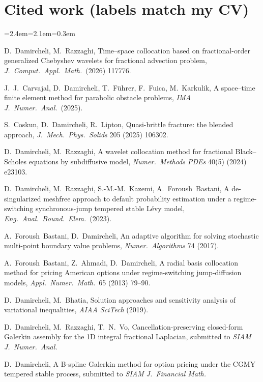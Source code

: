 \documentclass[11pt]{article}
\newcommand{\rc}[1]{\textcolor{accent}{[#1]}}
\begin{document}
\section*{Cited work {\normalfont\small(labels match my CV)}}
{\footnotesize
\setlength{\parskip}{0pt}
\begin{list}{}{\leftmargin=2.4em=2.1em=0.3em\itemsep=0pt\parsep=0pt}
\item[\rc{J1}] D.~Damircheli, M.~Razzaghi, Time--space collocation based on fractional-order generalized Chebyshev wavelets for fractional advection problem, \emph{J.\ Comput.\ Appl.\ Math.}\ (2026) 117776.
\item[\rc{J2}] J.~J.~Carvajal, D.~Damircheli, T.~F\"uhrer, F.~Fuica, M.~Karkulik, A space--time finite element method for parabolic obstacle problems, \emph{IMA J.\ Numer.\ Anal.}\ (2025).
\item[\rc{J3}] S.~Coskun, D.~Damircheli, R.~Lipton, Quasi-brittle fracture: the blended approach, \emph{J.\ Mech.\ Phys.\ Solids} 205 (2025) 106302.
\item[\rc{J4}] D.~Damircheli, M.~Razzaghi, A wavelet collocation method for fractional Black--Scholes equations by subdiffusive model, \emph{Numer.\ Methods PDEs} 40(5) (2024) e23103.
\item[\rc{J5}] D.~Damircheli, M.~Razzaghi, S.-M.-M.~Kazemi, A.~Foroush~Bastani, A de-singularized meshfree approach to default probability estimation under a regime-switching synchronous-jump tempered stable L\'evy model, \emph{Eng.\ Anal.\ Bound.\ Elem.}\ (2023).
\item[\rc{J6}] A.~Foroush~Bastani, D.~Damircheli, An adaptive algorithm for solving stochastic multi-point boundary value problems, \emph{Numer.\ Algorithms} 74 (2017).
\item[\rc{J7}] A.~Foroush~Bastani, Z.~Ahmadi, D.~Damircheli, A radial basis collocation method for pricing American options under regime-switching jump-diffusion models, \emph{Appl.\ Numer.\ Math.}\ 65 (2013) 79--90.
\item[\rc{C1}] D.~Damircheli, M.~Bhatia, Solution approaches and sensitivity analysis of variational inequalities, \emph{AIAA SciTech} (2019).
\item[\rc{S1}] D.~Damircheli, M.~Razzaghi, T.~N.~Vo, Cancellation-preserving closed-form Galerkin assembly for the 1D integral fractional Laplacian, submitted to \emph{SIAM J.\ Numer.\ Anal.}
\item[\rc{S2}] D.~Damircheli, A B-spline Galerkin method for option pricing under the CGMY tempered stable process, submitted to \emph{SIAM J.\ Financial Math.}

\end{list}}
\end{document}
